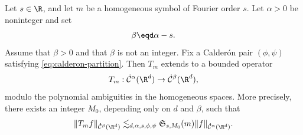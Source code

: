 \begin{proposition}
  \label{prop:smooth-convolution-singular-integral-holder}
  Let \(s \in \R\), and let \(m\) be a homogeneous symbol of Fourier order
  \(s\). Let \(\alpha > 0\) be noninteger and set
  \[
    \beta \eqd \alpha - s.
  \]
  Assume that \(\beta > 0\) and that \(\beta\) is not an integer. Fix a
  Calder{\'o}n pair \((\phi,\psi)\) satisfying
  \eqref{eq:calderon-partition}. Then \(T_m\) extends to a bounded operator
  \[
    T_m :
    \dot{\mathcal{C}}^{\alpha}(\R^d)
    \to
    \dot{\mathcal{C}}^{\beta}(\R^d),
  \]
  modulo the polynomial ambiguities in the homogeneous spaces. More precisely,
  there exists an integer \(M_0\), depending only on \(d\) and \(\beta\), such
  that
  \begin{equation}
    \label{eq:smooth-singular-integral-holder-bound}
    \|T_m f\|_{\dot{\mathcal{C}}^{\beta}(\R^d)}
    \lesssim_{d, \alpha, s, \phi, \psi}
    \mathfrak{S}_{s, M_0}(m)
    \|f\|_{\dot{\mathcal{C}}^{\alpha}(\R^d)}.
  \end{equation}
\end{proposition}


